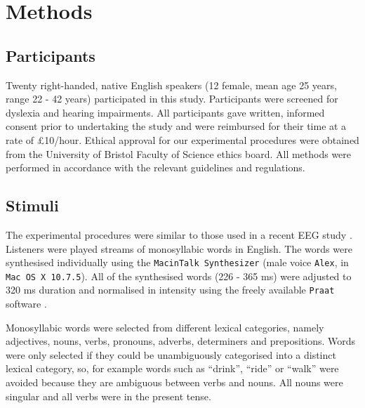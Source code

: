 \documentclass[10pt,letterpaper]{article}
\newcommand{\citet}[1]{\cite{#1}}
\begin{document}
\section*{Methods}
\subsection*{Participants}

Twenty right-handed, native English speakers (12 female, mean age 25
years, range 22 - 42 years) participated in this study. Participants
were screened for dyslexia and hearing impairments. All participants
gave written, informed consent prior to undertaking the study and were
reimbursed for their time at a rate of £10/hour. Ethical approval for
our experimental procedures were obtained from the University of
Bristol Faculty of Science ethics board. All methods were performed in
accordance with the relevant guidelines and regulations.

\subsection*{Stimuli}

The experimental procedures were similar to those used in a recent EEG
study \cite{DingEtAl2017}. Listeners were played streams of
monosyllabic words in English. The words were synthesised individually
using the \texttt{MacinTalk Synthesizer} (male voice \texttt{Alex}, in
\texttt{Mac OS X 10.7.5}). All of the synthesised words (226 - 365 ms)
were adjusted to 320 ms duration and normalised in intensity using the
freely available \texttt{Praat} software \citet{Praat}.

Monosyllabic words were selected from different lexical categories,
namely adjectives, nouns, verbs, pronouns, adverbs, determiners and
prepositions. Words were only selected if they could be unambiguously
categorised into a distinct lexical category, so, for example words
such as ``drink'', ``ride'' or ``walk'' were avoided because they are
ambiguous between verbs and nouns. All nouns were singular and all
verbs were in the present tense.
\end{document}
